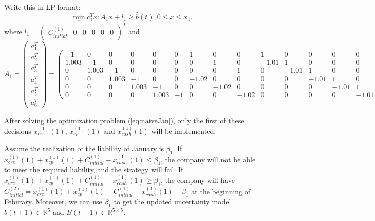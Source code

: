 \documentclass[13pt]{article}
\begin{document}
    Write this in LP format:
    \begin{equation}\label{eq:naiveJan}
        \min_x c_1^Tx: A_1x+l_1\geq\hat{b}(t), 0\leq x\leq \bar{x}_1.
    \end{equation}
    where $l_1 = \begin{pmatrix}C^{(1)}_{initial} & 0& 0& 0& 0& 0\end{pmatrix}^T$ and 
    \[
        A_1
        = 
        \begin{pmatrix}
            a_1^T \\
            a_2^T \\
            a_3^T \\
            a_4^T \\
            a_5^T \\
            a_6^T
        \end{pmatrix}
        =
        \begin{pmatrix}
            -1    &   0    &   0    &  0    &  0    &  0    &  1    &  0   &  0   &  1     &   0   &  0   &  0   &  0   \\
            1.003 &  -1    &   0    &  0    &  0    &  0    &  0    &  1   &  0   &  -1.01 &   1   &  0   &  0   &  0   \\
            0     & 1.003  &   -1   &  0    &  0    &  0    &  0    &  0   &  1   &  0     & -1.01 &  1   &  0   &  0   \\
            0     &  0     & 1.003  &   -1  &  0    &  0    & -1.02 &  0   &  0   &  0     &  0    & -1.01&  1   &  0   \\
            0     &  0     &  0     & 1.003 &  -1   &  0    &  0    &-1.02 &  0   &  0     &  0    &  0   &-1.01 &  1   \\
            0     &  0     &  0     &  0    & 1.003 &  -1   &  0    &  0   &-1.02 &  0     &  0    &  0   &  0   &-1.01
        \end{pmatrix}.
    \]

    After solving the optimization problem (\ref{eq:naiveJan}), only the first of these decisions $x^{(1)}_{cre}(1)$, $x^{(1)}_{cp}(1)$ and $x^{(1)}_{cash}(1)$ will be implemented. 

    Assume the realization of the liability of January is $\beta_1$. If $x^{(1)}_{cre}(1)+x^{(1)}_{cp}(1)+C^{(1)}_{initial} - x^{(1)}_{cash}(1) \leq \beta_1$, the company will not be able to meet the required liability, and the strategy will fail. If $x^{(1)}_{cre}(1)+x^{(1)}_{cp}(1)+C^{(1)}_{initial} - x^{(1)}_{cash}(1) \geq \beta_1$, the company will have $C^{(2)}_{initial} =  x^{(1)}_{cre}(1)+x^{(1)}_{cp}(1)+C^{(1)}_{initial} - x^{(1)}_{cash}(1) - \beta_1$ at the beginning of Feburary. Moreover, we can use $\beta_1$ to get the updated uncertainty model $\hat{b}(t+1)\in\mathbb{R}^5$ and $B(t+1)\in\mathbb{R}^{5\times5}$.
\end{document}
